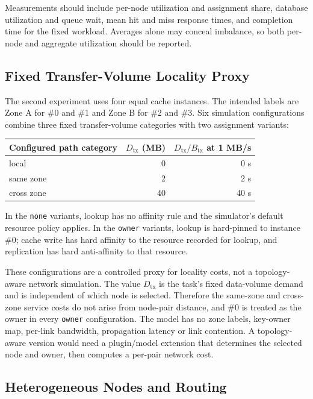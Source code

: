 \documentclass[conference]{IEEEtran}
\begin{document}
Measurements should include per-node utilization and assignment share, database utilization and queue wait, mean hit
and miss response times, and completion time for the fixed workload. Averages alone may conceal imbalance, so both
per-node and aggregate utilization should be reported.

\subsection{Fixed Transfer-Volume Locality Proxy}

The second experiment uses four equal cache instances. The intended labels are Zone A for \#0 and \#1 and Zone B for
\#2 and \#3. Six simulation configurations combine three fixed transfer-volume categories with two assignment
variants:
\begin{center}
\begin{tabular}{lrr}
\toprule
Configured path category & $D_{\mathrm{tx}}$ (MB) & $D_{\mathrm{tx}}/B_{\mathrm{tx}}$ at 1 MB/s\\
\midrule
local & 0 & 0 s\\
same zone & 2 & 2 s\\
cross zone & 40 & 40 s\\
\bottomrule
\end{tabular}
\end{center}
In the \texttt{none} variants, lookup has no affinity rule and the simulator's default resource policy applies. In the
\texttt{owner} variants, lookup is hard-pinned to instance \#0; cache write has hard affinity to the resource recorded
for lookup, and replication has hard anti-affinity to that resource.

These configurations are a controlled proxy for locality costs, not a topology-aware network simulation. The value
$D_{\mathrm{tx}}$ is the task's fixed data-volume demand and is independent of which node is selected. Therefore the
same-zone and cross-zone service costs do not arise from node-pair distance, and \#0 is treated as the owner in every
\texttt{owner} configuration. The model has no zone labels, key-owner map, per-link bandwidth, propagation latency or
link contention. A topology-aware version would need a plugin/model extension that determines the selected node and
owner, then computes a per-pair network cost.

\subsection{Heterogeneous Nodes and Routing}
\end{document}
